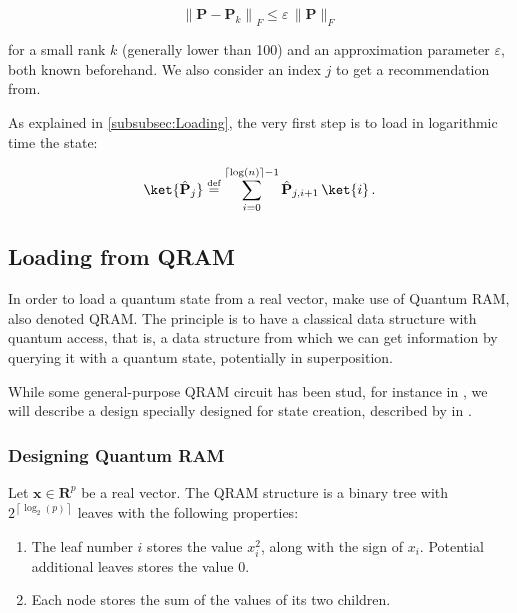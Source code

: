 \documentclass[11pt, a4paper]{article}
\begin{document}
        \[\left\|\mathbf{P}-\mathbf{P}_k\right\|_F\leqslant\varepsilon\,\|\mathbf{P}\|_F\]
        
        for a small rank \(k\) (generally lower than 100) and an approximation parameter \(\varepsilon\), both known beforehand. We also consider an index \(j\) to get a recommendation from.
        
        As explained in \autoref{subsubsec:Loading}, the very first step is to load in logarithmic time the state:
        
        \[\ket{\hat{\mathbf{P}}_j} \overset{\text{\tiny{def}}}{=} \sum_{i=0}^{\lceil\log(n)\rceil-1}\hat{\mathbf{P}}_{j,i + 1}\,\ket{i}\,.\]
        
        \subsection{Loading from QRAM}
            \label{subsec:LoadingQRAM}
            In order to load a quantum state from a real vector, \citeauthor{QRS} make use of Quantum RAM, also denoted QRAM. The principle is to have a classical data structure with quantum access, that is, a data structure from which we can get information by querying it with a quantum state, potentially in superposition.
            
            While some general-purpose QRAM circuit has been stud, for instance in \cite{QRAMCircuit}, we will describe a design specially designed for state creation, described by \citeauthor{Prakash} in \cite{Prakash}.
            
            \subsubsection{Designing Quantum RAM}
                \label{subsubsec:QRAM}
                Let \(\mathbf{x}\in\mathbf{R}^p\) be a real vector. The QRAM structure is a binary tree with \(2^{\left\lceil\log_2(p)\right\rceil}\) leaves with the following properties:
                
                \begin{enumerate}
                    \item The leaf number \(i\) stores the value \(x_i^2\), along with the sign of \(x_i\). Potential additional leaves stores the value \(0\). 
                    \item Each node stores the sum of the values of its two children.
                \end{enumerate}
                
\end{document}
